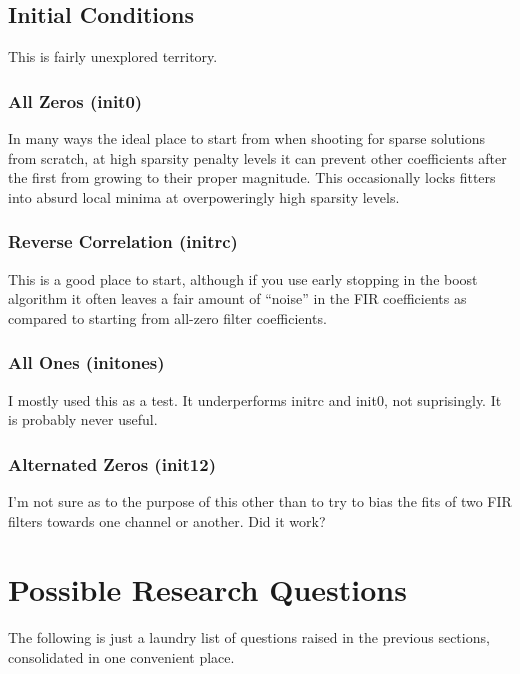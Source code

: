 \documentclass[11pt]{article}
\begin{document}
\subsection{Initial Conditions}
\label{sec-2.9}


   This is fairly unexplored territory. 

\subsubsection{All Zeros (init0)}
\label{sec-2.9.1}


    In many ways the ideal place to start from when shooting for sparse solutions from scratch, at high sparsity penalty levels it can prevent other coefficients after the first from growing to their proper magnitude. This occasionally locks fitters into absurd local minima at overpoweringly high sparsity levels.

\subsubsection{Reverse Correlation (initrc)}
\label{sec-2.9.2}


    This is a good place to start, although if you use early stopping in the boost algorithm it often leaves a fair amount of ``noise'' in the FIR coefficients as compared to starting from all-zero filter coefficients. 

\subsubsection{All Ones (initones)}
\label{sec-2.9.3}

    
    I mostly used this as a test. It underperforms initrc and init0, not suprisingly. It is probably never useful. 

\subsubsection{Alternated Zeros (init12)}
\label{sec-2.9.4}

    
    I'm not sure as to the purpose of this other than to try to bias the fits of two FIR filters towards one channel or another. Did it work?

\pagebreak
\section{Possible Research Questions}
\label{sec-3}

  
  The following is just a laundry list of questions raised in the previous sections, consolidated in one convenient place. 
\end{document}
